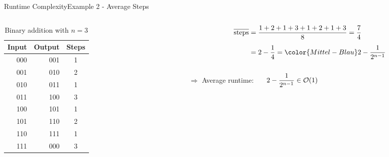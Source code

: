 
\begin{frame}{Runtime Complexity}{Example 2 - Average Steps}
  \vspace{-3em}
  \begin{columns}
    \begin{column}{0.5\linewidth}
      \begin{table}[!h]%
        \caption{Binary addition with $n=3$}%
        \label{tab:runtime:binary_addition_three}%
        \begin{tabular}{rrc}%
          Input & Output & Steps\\
          \midrule
          000 & 001 & 1\\
          001 & 010 & 2\\
          010 & 011 & 1\\
          011 & 100 & 3\\
          \midrule
          100 & 101 & 1\\
          101 & 110 & 2\\
          110 & 111 & 1\\
          111 & 000 & 3
        \end{tabular}
      \end{table}
    \end{column}
    \begin{column}{0.5\linewidth}
      \begin{align*}
        \overline{\text{steps}}
          &= \frac{1+2+1+3+1+2+1+3}{8} = \frac{7}{4}\\[0.5em]
        {} &= 2 - \frac{1}{4} = {\color{Mittel-Blau}2 - \frac{1}{2^{n-1}}}
      \end{align*}\\
      $\Rightarrow$ {\color{Mittel-Blau}Average runtime}:
      \begin{math}
        \displaystyle\hspace*{1.5em}
        2 - \frac{1}{2^{n-1}} \in \mathcal{O}(1)
        \end{math}
    \end{column}
  \end{columns}
\end{frame}


